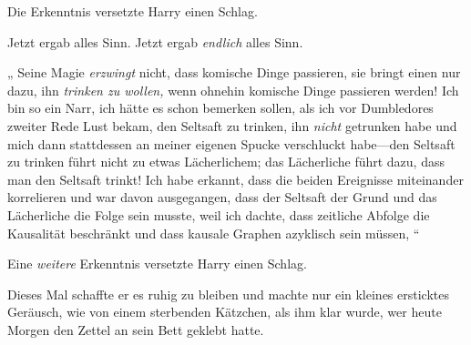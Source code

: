 Die Erkenntnis versetzte Harry einen Schlag.

Jetzt ergab alles Sinn. Jetzt ergab \emph{endlich} alles Sinn.

„ Seine Magie \emph{erzwingt} nicht, dass komische Dinge passieren, sie bringt einen nur dazu, ihn \emph{trinken zu wollen,} wenn ohnehin komische Dinge passieren werden! Ich bin so ein Narr, ich hätte es schon bemerken sollen, als ich vor Dumbledores zweiter Rede Lust bekam, den Seltsaft zu trinken, ihn \emph{nicht} getrunken habe und mich dann stattdessen an meiner eigenen Spucke verschluckt habe—den Seltsaft zu trinken führt nicht zu etwas Lächerlichem; das Lächerliche führt dazu, dass man den Seltsaft trinkt! Ich habe erkannt, dass die beiden Ereignisse miteinander korrelieren und war davon ausgegangen, dass der Seltsaft der Grund und das Lächerliche die Folge sein musste, weil ich dachte, dass zeitliche Abfolge die Kausalität beschränkt und dass kausale Graphen azyklisch sein müssen, “

Eine \emph{weitere} Erkenntnis versetzte Harry einen Schlag.

Dieses Mal schaffte er es ruhig zu bleiben und machte nur ein kleines ersticktes Geräusch, wie von einem sterbenden Kätzchen, als ihm klar wurde, wer heute Morgen den Zettel an sein Bett geklebt hatte.

